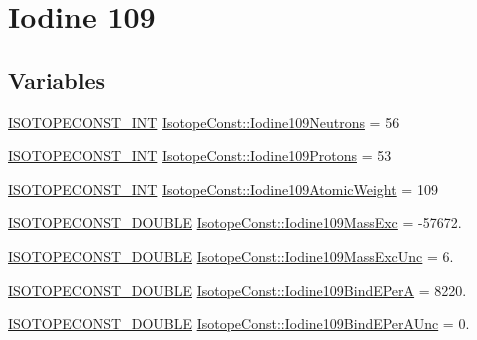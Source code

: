 \hypertarget{group___isotope_const-_iodine-_i109}{}\section{Iodine 109}
\label{group___isotope_const-_iodine-_i109}
\subsection*{Variables}
\begin{DoxyCompactItemize}
\item 
\mbox{\hyperlink{group___isotope_const-_macros_ga5f18360b3e99483a35c32d789e62621c}{I\+S\+O\+T\+O\+P\+E\+C\+O\+N\+S\+T\+\_\+\+I\+NT}} \mbox{\hyperlink{group___isotope_const-_iodine-_i109_gaff66486cc009827c507ef4feadeb47f3}{Isotope\+Const\+::\+Iodine109\+Neutrons}} = 56
\item 
\mbox{\hyperlink{group___isotope_const-_macros_ga5f18360b3e99483a35c32d789e62621c}{I\+S\+O\+T\+O\+P\+E\+C\+O\+N\+S\+T\+\_\+\+I\+NT}} \mbox{\hyperlink{group___isotope_const-_iodine-_i109_ga5902afda0278ac1c3d2f3922f2f0ee03}{Isotope\+Const\+::\+Iodine109\+Protons}} = 53
\item 
\mbox{\hyperlink{group___isotope_const-_macros_ga5f18360b3e99483a35c32d789e62621c}{I\+S\+O\+T\+O\+P\+E\+C\+O\+N\+S\+T\+\_\+\+I\+NT}} \mbox{\hyperlink{group___isotope_const-_iodine-_i109_ga1a86b4a6b88da4bd3744e666f5c85688}{Isotope\+Const\+::\+Iodine109\+Atomic\+Weight}} = 109
\item 
\mbox{\hyperlink{group___isotope_const-_macros_ga8f45a7272ce02c0b4c65c44636ed719a}{I\+S\+O\+T\+O\+P\+E\+C\+O\+N\+S\+T\+\_\+\+D\+O\+U\+B\+LE}} \mbox{\hyperlink{group___isotope_const-_iodine-_i109_gaec16a964ff83841b83230a88ea70b897}{Isotope\+Const\+::\+Iodine109\+Mass\+Exc}} = -\/57672.
\item 
\mbox{\hyperlink{group___isotope_const-_macros_ga8f45a7272ce02c0b4c65c44636ed719a}{I\+S\+O\+T\+O\+P\+E\+C\+O\+N\+S\+T\+\_\+\+D\+O\+U\+B\+LE}} \mbox{\hyperlink{group___isotope_const-_iodine-_i109_gafbe91348d82bc899ad6c39cb72ca66a9}{Isotope\+Const\+::\+Iodine109\+Mass\+Exc\+Unc}} = 6.
\item 
\mbox{\hyperlink{group___isotope_const-_macros_ga8f45a7272ce02c0b4c65c44636ed719a}{I\+S\+O\+T\+O\+P\+E\+C\+O\+N\+S\+T\+\_\+\+D\+O\+U\+B\+LE}} \mbox{\hyperlink{group___isotope_const-_iodine-_i109_gae7ffaabcbf963c8b613f2a2b7332d9db}{Isotope\+Const\+::\+Iodine109\+Bind\+E\+PerA}} = 8220.
\item 
\mbox{\hyperlink{group___isotope_const-_macros_ga8f45a7272ce02c0b4c65c44636ed719a}{I\+S\+O\+T\+O\+P\+E\+C\+O\+N\+S\+T\+\_\+\+D\+O\+U\+B\+LE}} \mbox{\hyperlink{group___isotope_const-_iodine-_i109_ga22c66da564459c8b346cc76f16b9f165}{Isotope\+Const\+::\+Iodine109\+Bind\+E\+Per\+A\+Unc}} = 0.

\end{DoxyCompactItemize}

